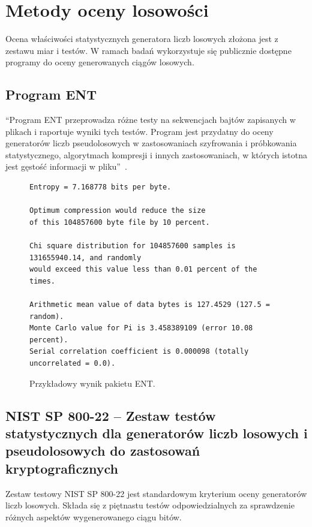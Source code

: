 \section{Metody oceny losowości}

\noindent Ocena właściwości statystycznych generatora liczb losowych złożona jest z 
zestawu miar i testów. W ramach badań wykorzystuje się publicznie dostępne 
programy do oceny generowanych ciągów losowych. 


\subsection{Program ENT}

\noindent \enquote{Program ENT przeprowadza różne testy 
na sekwencjach bajtów zapisanych w plikach i raportuje wyniki tych testów. Program jest 
przydatny do oceny generatorów liczb pseudolosowych w zastosowaniach szyfrowania i 
próbkowania statystycznego, algorytmach kompresji i innych zastosowaniach, w których 
istotna jest gęstość informacji w pliku}~\cite{fourmilab-ENT}.

\begin{figure}[H]
    \centering
    \begin{verbatim}
Entropy = 7.168778 bits per byte.

Optimum compression would reduce the size
of this 104857600 byte file by 10 percent.

Chi square distribution for 104857600 samples is 131655940.14, and randomly
would exceed this value less than 0.01 percent of the times.

Arithmetic mean value of data bytes is 127.4529 (127.5 = random).
Monte Carlo value for Pi is 3.458389109 (error 10.08 percent).
Serial correlation coefficient is 0.000098 (totally uncorrelated = 0.0).
    \end{verbatim}
    \caption{Przykładowy wynik pakietu ENT.}
    \label{fig:ch2_wyniki_ent}
\end{figure}


\subsection{NIST SP 800-22 -- Zestaw testów statystycznych dla generatorów liczb 
losowych i pseudolosowych do zastosowań kryptograficznych}

\noindent Zestaw testowy NIST SP 800-22 jest standardowym kryterium oceny 
generatorów liczb losowych. Składa się z piętnastu testów odpowiedzialnych za 
sprawdzenie różnych aspektów wygenerowanego ciągu bitów.

